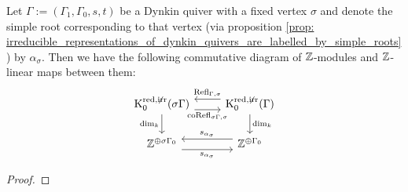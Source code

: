             \begin{proposition} \label{prop: (co)reflection_functors_as_simple_reflections}
                Let $\Gamma := (\Gamma_1, \Gamma_0, s, t)$ be a Dynkin quiver with a fixed vertex $\sigma$ and denote the simple root corresponding to that vertex (via proposition \ref{prop: irreducible_representations_of_dynkin_quivers_are_labelled_by_simple_roots}) by $\alpha_{\sigma}$. Then we have the following commutative diagram of $\mathbb{Z}$-modules and $\mathbb{Z}$-linear maps between them:
                    $$
                        \begin{tikzcd}
                        	{\K_0^{\red, \not \irr}(\sigma\Gamma)} & {\K_0^{\red, \not \irr}(\Gamma)} \\
                        	{\Z^{\oplus \sigma\Gamma_0}} & {\Z^{\oplus \Gamma_0}}
                        	\arrow["{\dim_k}"', from=1-1, to=2-1]
                        	\arrow["{s_{\alpha_{\sigma}}}"', shift right=2, from=2-2, to=2-1]
                        	\arrow["{\Refl_{\Gamma, \sigma}}"', shift right=2, from=1-2, to=1-1]
                        	\arrow["{\dim_k}", from=1-2, to=2-2]
                        	\arrow["{\co\Refl_{\sigma \Gamma, \sigma}}"', shift right=2, from=1-1, to=1-2]
                        	\arrow["{s_{\alpha_{\sigma}}}"', shift right=2, from=2-1, to=2-2]
                        \end{tikzcd}
                    $$
            \end{proposition}
                \begin{proof}
                    
                \end{proof}
                
